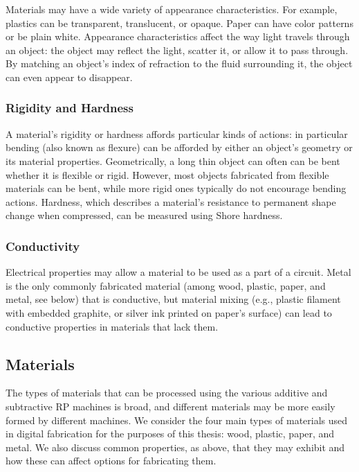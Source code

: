 Materials may have a wide variety of appearance characteristics. For example, plastics can be transparent, translucent, or opaque. Paper can have color patterns or be plain white. Appearance characteristics affect the way light travels through an object: the object may reflect the light, scatter it, or allow it to pass through. By matching an object's index of refraction to the fluid surrounding it, the object can even appear to disappear.

\subsubsection{Rigidity and Hardness}

A material's rigidity or hardness affords particular kinds of actions: in particular bending (also known as flexure) can be afforded by either an object's geometry or its material properties. Geometrically, a long thin object can often can be bent whether it is flexible or rigid. However, most objects fabricated from flexible materials can be bent, while more rigid ones typically do not encourage bending actions. Hardness, which describes a material's resistance to permanent shape change when compressed, can be measured using Shore hardness.

\subsubsection{Conductivity}

Electrical properties may allow a material to be used as a part of a circuit. Metal is the only commonly fabricated material (among wood, plastic, paper, and metal, see below) that is conductive, but material mixing (e.g., plastic filament with embedded graphite, or silver ink printed on paper's surface) can lead to conductive properties in materials that lack them.

\subsection{Materials}

The types of materials that can be processed using the various additive and subtractive RP machines is broad, and different materials may be more easily formed by different machines. We consider the four main types of materials used in digital fabrication for the purposes of this thesis: wood, plastic, paper, and metal. We also discuss common properties, as above, that they may exhibit and how these can affect options for fabricating them.


